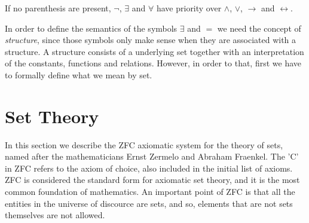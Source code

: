 \begin{example}
\end{example}

If no parenthesis are present, $\lnot$, $\exists$ and $\forall$ have priority over $\land$, $\lor$, $\rightarrow$ and $\leftrightarrow$.

In order to define the semantics of the symbols $\exists$ and $=$ we need the concept of \emph{structure}, since those symbols only make sense when they are associated with a structure. A structure consists of a underlying set together with an interpretation of the constants, functions and relations. However, in order to that, first we have to formally define what we mean by set.

%
%
\section{Set Theory}
\label{sec:set_theory}

In this section we describe the ZFC axiomatic system for the theory of sets, named after the mathematicians Ernst Zermelo and Abraham Fraenkel. The 'C' in ZFC refers to the axiom of choice, also included in the initial list of axioms. ZFC is considered the standard form for axiomatic set theory, and it is the most common foundation of mathematics. An important point of ZFC is that all the entities in the universe of discource are sets, and so, elements that are not sets themselves are not allowed.

